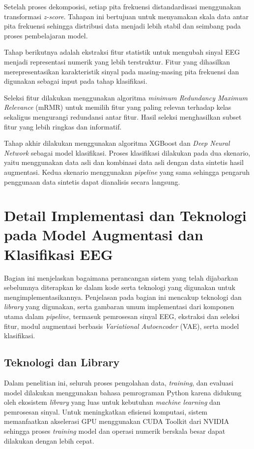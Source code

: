 Setelah proses dekomposisi, setiap pita frekuensi distandardisasi menggunakan transformasi \textit{z-score}. Tahapan ini bertujuan untuk menyamakan skala data antar pita frekuensi sehingga distribusi data menjadi lebih stabil dan seimbang pada proses pembelajaran model.

Tahap berikutnya adalah ekstraksi fitur statistik untuk mengubah sinyal EEG menjadi representasi numerik yang lebih terstruktur. Fitur yang dihasilkan merepresentasikan karakteristik sinyal pada masing-masing pita frekuensi dan digunakan sebagai input pada tahap klasifikasi.

Seleksi fitur dilakukan menggunakan algoritma \textit{minimum Redundancy Maximum Relevance} (mRMR) untuk memilih fitur yang paling relevan terhadap kelas sekaligus mengurangi redundansi antar fitur. Hasil seleksi menghasilkan subset fitur yang lebih ringkas dan informatif.

Tahap akhir dilakukan menggunakan algoritma XGBoost dan \textit{Deep Neural Network} sebagai model klasifikasi. Proses klasifikasi dilakukan pada dua skenario, yaitu menggunakan data asli dan kombinasi data asli dengan data sintetis hasil augmentasi. Kedua skenario menggunakan \textit{pipeline} yang sama sehingga pengaruh penggunaan data sintetis dapat dianalisis secara langsung.

\section{Detail Implementasi dan Teknologi pada Model Augmentasi dan Klasifikasi EEG}
\label{Detail Implementasi dan Teknologi}

Bagian ini menjelaskan bagaimana perancangan sistem yang telah dijabarkan sebelumnya diterapkan ke dalam kode serta teknologi yang digunakan untuk mengimplementasikannya. Penjelasan pada bagian ini mencakup teknologi dan \textit{library} yang digunakan, serta gambaran umum implementasi dari komponen utama dalam \textit{pipeline}, termasuk pemrosesan sinyal EEG, ekstraksi dan seleksi fitur, modul augmentasi berbasis \textit{Variational Autoencoder} (VAE), serta model klasifikasi. 

\subsection{Teknologi dan Library}
\label{Teknologi dan Library}

Dalam penelitian ini, seluruh proses pengolahan data, \textit{training}, dan evaluasi model dilakukan menggunakan bahasa pemrograman Python karena didukung oleh ekosistem \textit{library} yang luas untuk kebutuhan \textit{machine learning} dan pemrosesan sinyal. Untuk meningkatkan efisiensi komputasi, sistem memanfaatkan akselerasi GPU menggunakan CUDA Toolkit dari NVIDIA sehingga proses \textit{training} model dan operasi numerik berskala besar dapat dilakukan dengan lebih cepat.

